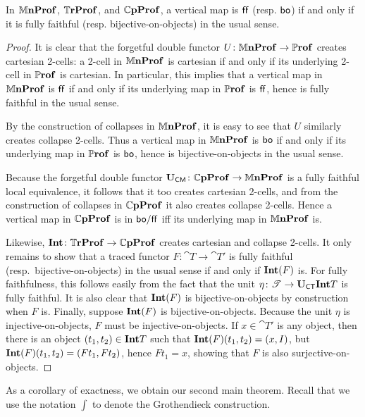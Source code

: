\documentclass[11pt,oneside,article]{memoir}
\begin{document}
\begin{proposition}
    \label{prop:(bo,ff)_really_is}
  In $\mathbb{M}\mathbf{nProf}$, $\mathbb{T}\mathbf{rProf}$, and $\mathbb{C}\mathbf{pProf}$, a vertical map is $\mathsf{ff}$ (resp. $\mathsf{bo}$) if and only if
  it is fully faithful (resp. bijective-on-objects) in the usual sense.
\end{proposition}
\begin{proof}
  It is clear that the forgetful double functor $U\colon\mathbb{M}\mathbf{nProf}\to\mathbb{P}\mathbf{rof}$ creates cartesian 2-cells: a
  2-cell in $\mathbb{M}\mathbf{nProf}$ is cartesian if and only if its underlying 2-cell in $\mathbb{P}\mathbf{rof}$ is cartesian.
  In particular, this implies that a vertical map in $\mathbb{M}\mathbf{nProf}$ is $\mathsf{ff}$ if and only if its
  underlying map in $\mathbb{P}\mathbf{rof}$ is $\mathsf{ff}$, hence is fully faithful in the usual sense.

  By the construction of collapses in $\mathbb{M}\mathbf{nProf}$, it is easy to see that $U$ similarly creates
  collapse 2-cells. Thus a vertical map in $\mathbb{M}\mathbf{nProf}$ is $\mathsf{bo}$ if and only if its underlying map in
  $\mathbb{P}\mathbf{rof}$ is $\mathsf{bo}$, hence is bijective-on-objects in the usual sense.

  Because the forgetful double functor $\mathbf{U}_{\mathsf{CM}}\colon\mathbb{C}\mathbf{pProf}\to\mathbb{M}\mathbf{nProf}$ is a fully faithful local
  equivalence, it follows that it too creates cartesian 2-cells, and from the construction of
  collapses in $\mathbb{C}\mathbf{pProf}$ it also creates collapse 2-cells. Hence a vertical map in $\mathbb{C}\mathbf{pProf}$
  is in $\mathsf{bo}/\mathsf{ff}$ iff its underlying map in $\mathbb{M}\mathbf{nProf}$ is.

  Likewise, $\mathbf{Int}\colon\mathbb{T}\mathbf{rProf}\to\mathbb{C}\mathbf{pProf}$ creates cartesian and collapse 2-cells. It only remains 
  to show that a traced functor $F\colon\cat{T}\to\cat{T}'$ is fully faithful (resp.\
  bijective-on-objects) in the usual sense if and only if $\mathbf{Int}(F)$ is. For fully faithfulness, this
  follows easily from the fact that the unit $\eta\colon\mathscr{T}\to\mathbf{U}_{\mathsf{CT}}\mathbf{Int} T$ is fully faithful. It
  is also clear that $\mathbf{Int}(F)$ is bijective-on-objects by construction when $F$ is. Finally, suppose
  $\mathbf{Int}(F)$ is bijective-on-objects. Because the unit $\eta$ is injective-on-objects, $F$ must be
  injective-on-objects. If $x\in\cat{T}'$ is any object, then there is an object $(t_1,t_2)\in\mathbf{Int}
  T$ such that $\mathbf{Int}(F)(t_1,t_2)=(x,I)$, but $\mathbf{Int}(F)(t_1,t_2)=(Ft_1,Ft_2)$, hence $Ft_1=x$, showing
  that $F$ is also surjective-on-objects.
\end{proof}

As a corollary of exactness, we obtain our second main theorem. Recall that we use the notation $\int$ to denote the Grothendieck construction.
\end{document}
